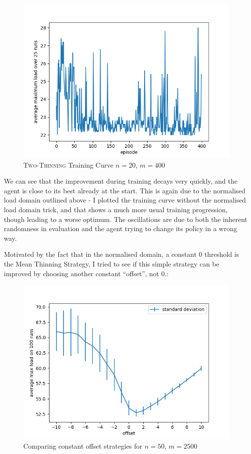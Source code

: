 \begin{figure}[h!] \label{two-thinning-training-curve}
    \centering
    \includegraphics[scale=1.0]{Chapter4/Figs/training_progression_20_400.png}
    \caption{\textsc{Two-Thinning} Training Curve $n=20$, $m=400$}
\end{figure}


We can see that the improvement during training decays very quickly, and the agent is close to its best already at the start. This is again due to the normalised load domain outlined above - I plotted the training curve without the normalised load domain trick, and that shows a much more usual training progression, though leading to a worse optimum. The oscillations are due to both the inherent randomness in evaluation and the agent trying to change its policy in a wrong way.


Motivated by the fact that in the normalised domain, a constant $0$ threshold is the Mean Thinning Strategy, I tried to see if this simple strategy can be improved by choosing another constant ``offset'', not $0$.:

\begin{figure}[h!] \label{two-thinning-training-curve}
    \centering
    \includegraphics[scale=1.0]{Chapter4/Figs/offset_analysis_50_2500.png}
    \caption{Comparing constant offset strategies for $n=50$, $m=2500$}
\end{figure}


